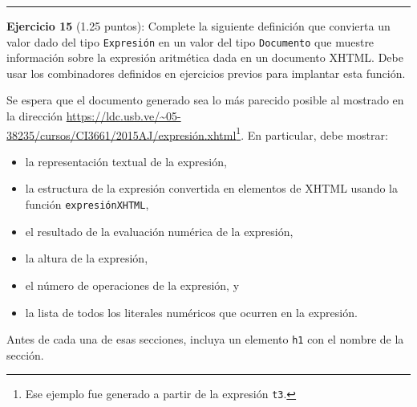 \begin{center}\rule{3in}{0.4pt}\end{center}

\textbf{Ejercicio 15} (1.25 puntos): Complete la siguiente definición
que convierta un valor dado del tipo \texttt{Expresión} en un valor del
tipo \texttt{Documento} que muestre información sobre la expresión
aritmética dada en un documento XHTML. Debe usar los combinadores
definidos en ejercicios previos para implantar esta función.

Se espera que el documento generado sea lo más parecido posible al
mostrado en la dirección
\url{https://ldc.usb.ve/~05-38235/cursos/CI3661/2015AJ/expresión.xhtml}\footnote{Ese
  ejemplo fue generado a partir de la expresión \texttt{t3}.}. En
particular, debe mostrar:

\begin{itemize}
\itemsep1pt\parskip0pt
\item
  la representación textual de la expresión,
\item
  la estructura de la expresión convertida en elementos de XHTML usando
  la función \texttt{expresiónXHTML},
\item
  el resultado de la evaluación numérica de la expresión,
\item
  la altura de la expresión,
\item
  el número de operaciones de la expresión, y
\item
  la lista de todos los literales numéricos que ocurren en la expresión.
\end{itemize}

Antes de cada una de esas secciones, incluya un elemento \texttt{h1} con
el nombre de la sección.

\begin{Shaded}
\begin{Highlighting}[]
\OtherTok{->} 
\NormalTok{expresiónDocumento e = Documento (htmlE [headE [titleE }\NormalTok{, styleE estilo], }
                                         \NormalTok{bodyE [h1E }
                                                \NormalTok{, showP (literales' e)]}
                                  \NormalTok{])}
\end{Highlighting}
\end{Shaded}

